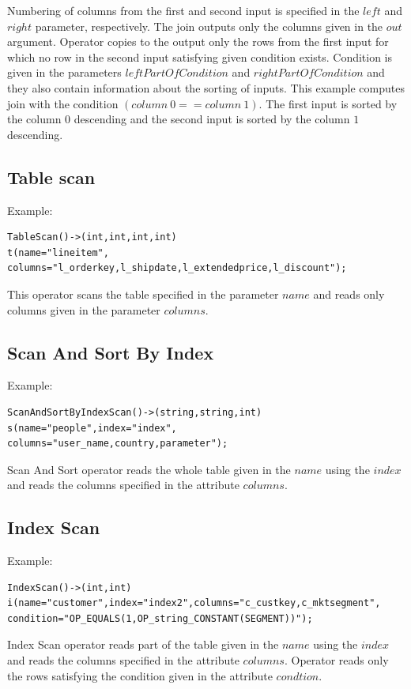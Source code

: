 Numbering of columns from the first and second input is specified in the $left$ and $right$ parameter, respectively. The join outputs only the columns given in the $out$ argument. Operator copies to the output only  the rows from the first input for which no row in the second input satisfying given condition exists.
Condition is given in the parameters $leftPartOfCondition$ and $rightPartOfCondition$ and they also contain information about the sorting of inputs. This example computes join with the condition $(column~0==column~1)$. The first input is sorted by the column $0$ descending and the second input is sorted by the column $1$ descending.

\subsection{Table scan}
Example:
\begin{lstlisting}
TableScan()->(int,int,int,int)
t(name="lineitem",
columns="l_orderkey,l_shipdate,l_extendedprice,l_discount");
\end{lstlisting}
This operator scans the table specified in the parameter $name$ and reads only columns given in the parameter $columns$.

\subsection{Scan And Sort By Index}
Example:
\begin{lstlisting}
ScanAndSortByIndexScan()->(string,string,int)
s(name="people",index="index",
columns="user_name,country,parameter"); 
\end{lstlisting}
Scan And Sort operator reads the whole table given in the $name$ using the $index$ and reads the columns specified in the attribute $columns$.

\subsection{Index Scan}

Example:
\begin{lstlisting}
IndexScan()->(int,int)
i(name="customer",index="index2",columns="c_custkey,c_mktsegment",
condition="OP_EQUALS(1,OP_string_CONSTANT(SEGMENT))");
\end{lstlisting}
Index Scan operator reads part of the table given in the $name$ using the $index$ and reads the columns specified in the attribute $columns$. Operator reads only the rows satisfying the condition given in the attribute $condtion$.



